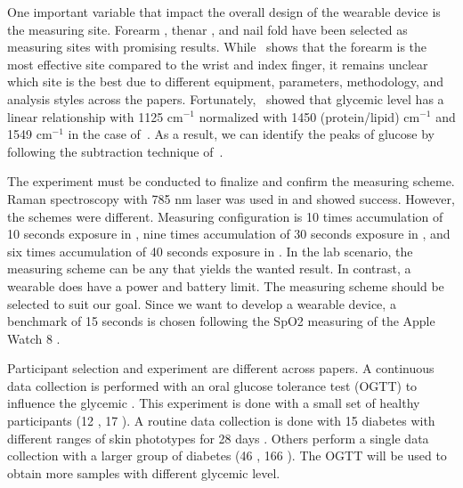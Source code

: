\begin{sloppypar}
One important variable that impact the overall design of the wearable device is the measuring site.
Forearm \citep{forearm2005, forearm2014}, thenar \citep{glucobeam}, and nail fold \citep{ramanNailFold2019} have been selected as measuring sites with promising results. 
While~\cite{sitecompare} shows that the forearm is the most effective site compared to the wrist and index finger, it remains unclear which site is the best due to different equipment, parameters, methodology, and analysis styles across the papers.
Fortunately,~\cite{directGlucose} showed that glycemic level has a linear relationship with 1125 $\text{cm}^{-1}$ normalized with 1450 (protein/lipid) $\text{cm}^{-1}$ and 1549 $\text{cm}^{-1}$ in the case of~\cite{solutionGlucose}.
As a result, we can identify the peaks of glucose by following the subtraction technique of~\cite{directGlucose}.
\end{sloppypar}

The experiment must be conducted to finalize and confirm the measuring scheme. 
Raman spectroscopy with 785 nm laser was used in \citep{forearm2014, sitecompare, ramanNailFold2019} and showed success.
However, the schemes were different. 
Measuring configuration is 10 times accumulation of 10 seconds exposure in \cite{forearm2014}, nine times accumulation of 30 seconds exposure in \citep{sitecompare}, and six times accumulation of 40 seconds exposure in \citep{ramanNailFold2019}. 
In the lab scenario, the measuring scheme can be any that yields the wanted result. 
In contrast, a wearable does have a power and battery limit. 
The measuring scheme should be selected to suit our goal.
Since we want to develop a wearable device, a benchmark of 15 seconds is chosen following the SpO2 measuring of the Apple Watch 8 \citep{applewatch}.

Participant selection and experiment are different across papers.
A continuous data collection is performed with an oral glucose tolerance test (OGTT) to influence the glycemic \citep{ramanNailFold2019, forearm2005}.
This experiment is done with a small set of healthy participants (12 \citep{ramanNailFold2019}, 17 \citep{forearm2005}).
A routine data collection is done with 15 diabetes with different ranges of skin phototypes for 28 days \citep{glucobeam-proof}.   
Others perform a single data collection with a larger group of diabetes (46 \citep{sitecompare}, 166 \citep{forearm2014}).
The OGTT will be used to obtain more samples with different glycemic level.

